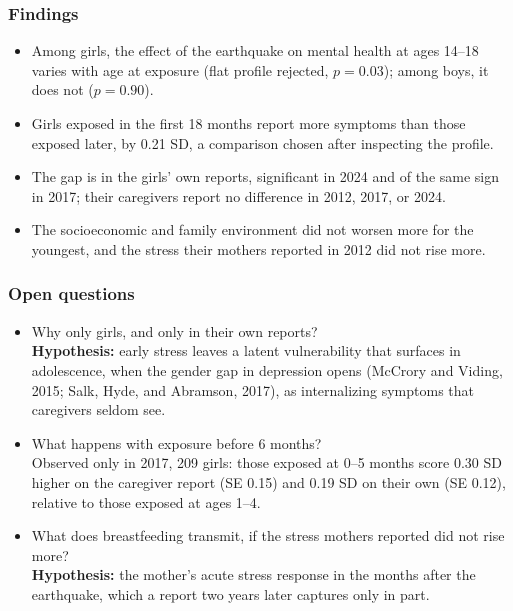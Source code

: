 \documentclass[aspectratio=169,11pt]{beamer}
\newcommand{\cita}[1]{{\footnotesize\color{azul}#1}}
\begin{document}
\begin{frame}
\frametitle{Findings}
\vspace{4mm}
\begin{itemize}\setlength{\itemsep}{4mm}
\item Among girls, the effect of the earthquake on mental health at ages 14--18 varies with
      age at exposure (flat profile rejected, $p = 0.03$); among boys, it does not ($p = 0.90$).
\item Girls exposed in the first 18 months report more symptoms than those exposed later,
      by 0.21 SD, a comparison chosen after inspecting the profile.
\item The gap is in the girls' own reports, significant in 2024 and of the same sign in 2017;
      their caregivers report no difference in 2012, 2017, or 2024.
\item The socioeconomic and family environment did not worsen more for the youngest, and
      the stress their mothers reported in 2012 did not rise more.
\end{itemize}
\end{frame}

\begin{frame}
\frametitle{Open questions}
\vspace{1mm}
{\small
\begin{itemize}\setlength{\itemsep}{3mm}
\item Why only girls, and only in their own reports?\\[1.5mm]
      \textbf{Hypothesis:} early stress leaves a latent vulnerability that surfaces in
      adolescence, when the gender gap in depression opens \cita{(McCrory and Viding, 2015;
      Salk, Hyde, and Abramson, 2017)}, as internalizing symptoms that caregivers seldom see.
\item What happens with exposure before 6 months?\\[1.5mm]
      Observed only in 2017, 209 girls: those exposed at 0--5 months score 0.30 SD higher on the
      caregiver report (SE 0.15) and 0.19 SD on their own (SE 0.12), relative to those
      exposed at ages 1--4.
\item What does breastfeeding transmit, if the stress mothers reported did not rise more?\\[1.5mm]
      \textbf{Hypothesis:} the mother's acute stress response in the months after the
      earthquake, which a report two years later captures only in part.
\end{itemize}}
\end{frame}
\end{document}
